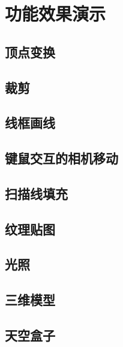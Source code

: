 

    \chapter{功能效果演示}

    \section{顶点变换}

    \section{裁剪}
    
    \section{线框画线}
    
    \section{键鼠交互的相机移动}
    
    \section{扫描线填充}
    
    \section{纹理贴图}
    
    \section{光照}
    
    \section{三维模型}
    
    \section{天空盒子}

